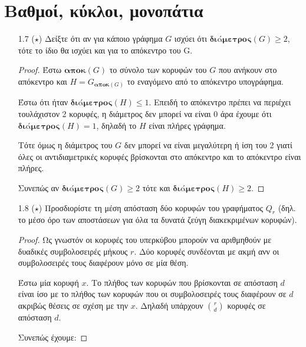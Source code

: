 \documentclass[a4paper, oneside, 11pt]{article}
\begin{document}


\section{Βαθμοί, κύκλοι, μονοπάτια}

\begin{enumerate}
\item[1.7 ($\star$)]
   Δείξτε ότι αν για κάποιο γράφημα $G$ ισχύει ότι
   $\textbf{διάμετρος}(G) \geq 2$, τότε το ίδιο θα ισχύει και για
   το απόκεντρο του G.

   \begin{proof}
   Έστω $\textbf{αποκ}(G)$ το σύνολο των κορυφών του $G$ που ανήκουν στο
   απόκεντρο και $H = G_{\textbf{αποκ}(G)}$ το εναγόμενο από το απόκεντρο
   υπογράφημα.

   Έστω ότι ήταν $\textbf{διάμετρος}(H) \leq 1$. Επειδή το απόκεντρο
   πρέπει να περιέχει τουλάχιστον 2 κορυφές, η διάμετρος δεν μπορεί
   να είναι 0 άρα έχουμε ότι
   $\textbf{διάμετρος}(H) = 1$, δηλαδή το $H$ είναι πλήρες γράφημα.

   Τότε όμως η διάμετρος του $G$ δεν μπορεί να είναι μεγαλύτερη ή ίση
   του 2 γιατί όλες οι αντιδιαμετρικές κορυφές βρίσκονται στο
   απόκεντρο και το απόκεντρο είναι πλήρες.

   Συνεπώς αν $\textbf{διάμετρος}(G) \geq 2$ τότε και
   $\textbf{διάμετρος}(H) \geq 2$.
   \end{proof}

\item[1.8 ($\star$)]
   Προσδιορίστε τη μέση απόσταση δύο κορυφών του γραφήματος $Q_r$ (δηλ.
   το μέσο όρο των αποστάσεων για όλα τα δυνατά ζεύγη διακεκριμένων κορυφών).

   \begin{proof}
      Ως γνωστόν οι κορυφές του υπερκύβου μπορούν να αριθμηθούν
      με δυαδικές συμβολοσειρές μήκους $r$. Δύο κορυφές συνδέονται
      με ακμή ανν οι συμβολοσειρές τους διαφέρουν μόνο σε μία θέση.

      Έστω μία κορυφή $x$. Το πλήθος των κορυφών που βρίσκονται σε
      απόσταση $d$ είναι ίσο με το πλήθος των κορυφών που οι συμβολοσειρές τους
      διαφέρουν σε $d$ ακριβώς θέσεις σε σχέση με την $x$. Δηλαδή υπάρχουν
      ${r \choose d}$ κορυφές σε απόσταση $d$.

      Συνεπώς έχουμε:


\end{proof}
\end{enumerate}
\end{document}
